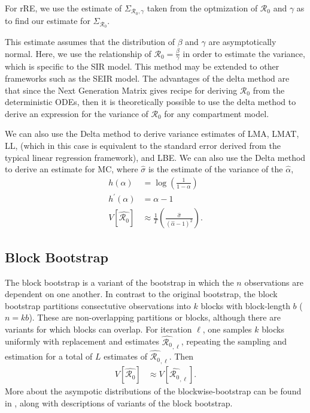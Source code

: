 \documentclass[12pt]{article}
\newcommand{\rr}{\ensuremath{\mathcal{R}_0}}
\begin{document}
For rRE, we use the estimate of $\Sigma_{\rr, \gamma}$ taken from the optmization of $\rr$ and $\gamma$ as to find our estimate for $\hat{\Sigma}_{\rr}$.

This estimate assumes that the distribution of $\beta$ and $\gamma$ are asymptotically normal.  Here, we use the relationship of $\rr = \frac{\beta}{\gamma}$ in order to estimate the variance, which is specific to the SIR model.  This method may be extended to other frameworks such as the SEIR model.  The advantages of the delta method are that since the Next Generation Matrix \citep{diekmann2009} gives recipe for deriving $\rr$ from the deterministic ODEs, then it is theoretically possible to use the delta method to derive an expression for the variance of $\rr$ for any compartment model.

We can also use the Delta method to derive variance estimates of LMA, LMAT, LL, (which in this case is equivalent to the standard error derived from the typical linear regression framework), and LBE.  We can also use the Delta method to derive an estimate for MC, where $\hat{\sigma}$ is the estimate of the variance of the $\hat{\alpha}$,
\begin{align*}
h(\alpha) &= \log \left ( \frac{1}{1-\alpha}\right ) \\
  h^\prime(\alpha) &= \alpha - 1 \\
                     V[ \hat{\rr} ] & \approx \frac{1}{T}  \left (\frac{\hat{\sigma}}{(\hat{\alpha} - 1)^2} \right ).
\end{align*}

\subsection{Block Bootstrap}

The block bootstrap is a variant of the bootstrap in which the $n$ observations are dependent on one another.  In contrast to the original bootstrap, the block bootstrap partitions consectutive observations into $k$ blocks with block-length $b$ ($n=kb$).  These are non-overlapping partitions or blocks, although there are variants for which blocks can overlap.  For iteration $\ell$, one samples $k$ blocks uniformly with replacement and estimates $\hat{\rr}_{,\ell}$, repeating the sampling and estimation for a total of $L$ estimates of $\hat{\rr}_{,\ell}$.  Then
\begin{align*}
  V\left [ \hat{\rr} \right ] &\approx V\left [\hat{\rr}_{,\ell} \right ].
\end{align*}
More about the asympotic distributions of the blockwise-bootstrap can be found in \cite{cao1999}, along with descriptions of variants of the block bootstrap.
\end{document}
